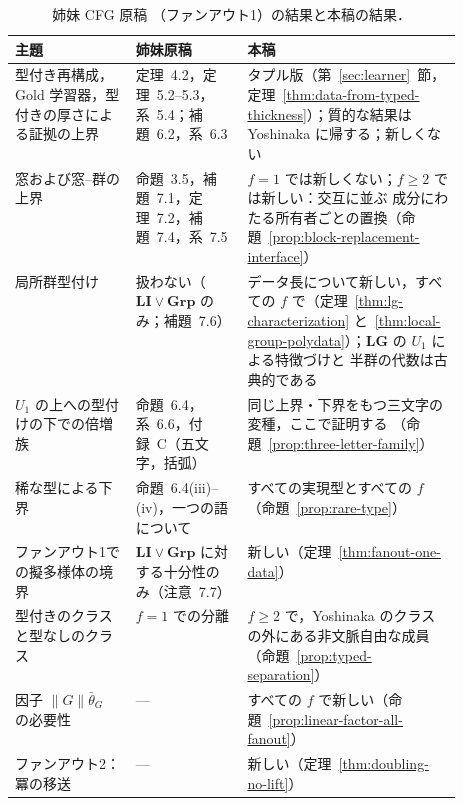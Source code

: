 \begin{table}[htbp]
\caption{姉妹 CFG 原稿 \cite{kuriyamaCFG}
（ファンアウト1）の結果と本稿の結果．}
\label{tab:companion-overlap}
\centering
\footnotesize
\setlength{\tabcolsep}{3pt}
\renewcommand{\arraystretch}{1.15}
\begin{tabularx}{\linewidth}{@{}>{\raggedright\arraybackslash}p{0.27\linewidth}>{\raggedright\arraybackslash}p{0.25\linewidth}>{\raggedright\arraybackslash}X@{}}
\hline
主題 & 姉妹原稿 \cite{kuriyamaCFG} & 本稿\\
\hline
型付き再構成，Gold 学習器，型付きの厚さによる証拠の上界
 & 定理~4.2，定理~5.2--5.3，系~5.4；補題~6.2，系~6.3
 & タプル版（第~\ref{sec:learner}~節，
   定理~\ref{thm:data-from-typed-thickness}）；質的な結果は
   Yoshinaka に帰する；新しくない\\
窓および窓--群の上界
 & 命題~3.5，補題~7.1，定理~7.2，補題~7.4，系~7.5
 & $f=1$ では新しくない；$f\ge2$ では新しい：交互に並ぶ
   成分にわたる所有者ごとの置換（命題~\ref{prop:block-replacement-interface}）\\
局所群型付け
 & 扱わない（$\mathbf{LI}\vee\mathbf{Grp}$ のみ；補題~7.6）
 & データ長について新しい，すべての $f$ で（定理~\ref{thm:lg-characterization}
   と~\ref{thm:local-group-polydata}）；$\mathbf{LG}$ の $U_1$ による特徴づけと
   半群の代数は古典的である \cite{AlmeidaEtAl2009}\\
$U_1$ の上への型付けの下での倍増族
 & 命題~6.4，系~6.6，付録~C（五文字，括弧）
 & 同じ上界・下界をもつ三文字の変種，ここで証明する
   （命題~\ref{prop:three-letter-family}）\\
稀な型による下界
 & 命題~6.4(iii)--(iv)，一つの語について
 & すべての実現型とすべての $f$（命題~\ref{prop:rare-type}）\\
ファンアウト1での擬多様体の境界
 & $\mathbf{LI}\vee\mathbf{Grp}$ に対する十分性のみ（注意~7.7）
 & 新しい（定理~\ref{thm:fanout-one-data}）\\
型付きのクラスと型なしのクラス
 & $f=1$ での分離
 & $f\ge2$ で，Yoshinaka のクラスの外にある非文脈自由な成員
   （命題~\ref{prop:typed-separation}）\\
因子 $\|G\|\bar\theta_G$ の必要性
 & ---
 & すべての $f$ で新しい（命題~\ref{prop:linear-factor-all-fanout}）\\
ファンアウト2：冪の移送
 & ---
 & 新しい（定理~\ref{thm:doubling-no-lift}）\\
\hline
\end{tabularx}
\end{table}

